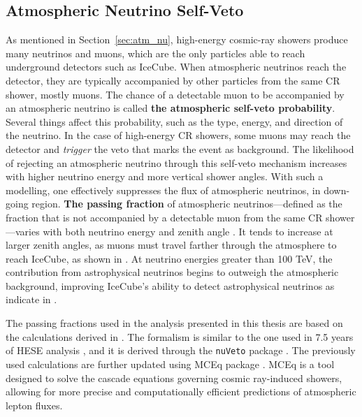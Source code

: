 \subsection*{Atmospheric Neutrino Self-Veto}
\label{sec:selfveto}
As mentioned in Section~\ref{sec:atm_nu}, high-energy cosmic-ray showers produce many neutrinos and muons, which are the only particles able to reach underground detectors such as IceCube. When atmospheric neutrinos reach the detector, they are typically accompanied by other particles from the same CR shower, mostly muons. The chance of a detectable muon to be accompanied by an atmospheric neutrino is called \textbf{the atmospheric self-veto probability}. Several things affect this probability, such as the type, energy, and direction of the neutrino. In the case of high-energy CR showers, some muons may reach the detector and \emph{trigger} the veto that marks the event as background. The likelihood of rejecting an atmospheric neutrino through this self-veto mechanism increases with higher neutrino energy and more vertical shower angles. With such a modelling, one effectively suppresses the flux of atmospheric neutrinos, in down-going region. \textbf{The passing fraction} of atmospheric neutrinos—defined as the fraction that is not accompanied by a detectable muon from the same CR shower—varies with both neutrino energy and zenith angle . It tends to increase at larger zenith angles, as muons must travel farther through the atmosphere to reach IceCube, as shown in . At neutrino energies greater than 100 TeV, the contribution from astrophysical neutrinos begins to outweigh the atmospheric background, improving IceCube's ability to detect astrophysical neutrinos as indicate in .

The passing fractions used in the analysis presented in this thesis are based on the calculations derived in \cite{pass_frac}. The formalism is similar to the one used in 7.5 years of HESE analysis \cite{HESE7_sample}, and it is derived through the \texttt{nuVeto} package . The previously used calculations are further updated using MCEq package . MCEq is a tool designed to solve the cascade equations governing cosmic ray-induced showers, allowing for more precise and computationally efficient predictions of atmospheric lepton fluxes. 

